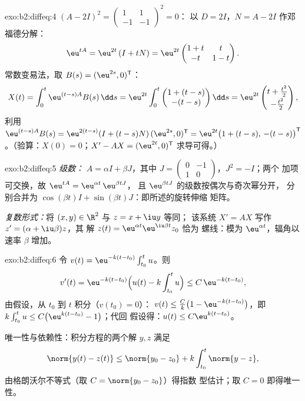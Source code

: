 \begin{solution}{exo:b2:diffeq:4}
$(A - 2I)^2 = \begin{pmatrix}1 & 1\\ -1 & -1\end{pmatrix}^2 = 0$：
以 $D = 2I$，$N = A - 2I$ 作邓福德分解：
\[
\eu^{tA} = \eu^{2t}\,(I + tN)
= \eu^{2t}\begin{pmatrix} 1 + t & t\\ -t & 1 - t\end{pmatrix}.
\]
常数变易法，取 $B(s) = (\eu^{2s}, 0)^{\mathsf T}$：
\[
X(t) = \int_0^t \eu^{(t-s)A}B(s)\,\dd s
= \eu^{2t}\int_0^t \begin{pmatrix} 1 + (t-s)\\ -(t-s)
\end{pmatrix}\dd s
= \eu^{2t}\begin{pmatrix} t + \frac{t^2}{2}\\[2pt] -\frac{t^2}{2}
\end{pmatrix},
\]
利用 $\eu^{(t-s)A}B(s) = \eu^{2(t-s)}(I + (t-s)N)\,(\eu^{2s},
0)^{\mathsf T} = \eu^{2t}\bigl(1 + (t-s),\, -(t-s)\bigr)^{\mathsf
T}$。（验算：$X(0) = 0$；$X' - AX = (\eu^{2t}, 0)^{\mathsf T}$
求导可得。）
\end{solution}

\begin{solution}{exo:b2:diffeq:5}
\emph{级数：} $A = \alpha I + \beta J$，其中 $J =
\begin{pmatrix}0 & -1\\ 1 & 0\end{pmatrix}$，$J^2 = -I$；两个
加项可交换，故 $\eu^{tA} = \eu^{\alpha t}\,\eu^{\beta tJ}$，
且 $\eu^{\beta t J}$ 的级数按偶次与奇次幂分开，
分别合并为 $\cos(\beta t)I + \sin(\beta t)J$：即所述的旋转伸缩
矩阵。

\emph{复数形式：}将 $(x, y) \in \R^2$ 与 $z = x + \iu y$ 等同；
该系统 $X' = AX$ 写作 $z' = (\alpha + \iu\beta)z$，其
解 $z(t) = \eu^{\alpha t}\eu^{\iu\beta t}z_0$ 恰为
螺线：模为 $\eu^{\alpha t}$，辐角以速率
$\beta$ 增加。
\end{solution}

\begin{solution}{exo:b2:diffeq:6}
令 $v(t) = \eu^{-k(t - t_0)}\int_{t_0}^t u$。则
\[
v'(t) = \eu^{-k(t-t_0)}\Bigl(u(t) - k\int_{t_0}^t u\Bigr)
\leq C\,\eu^{-k(t-t_0)},
\]
由假设，从 $t_0$ 到 $t$ 积分（$v(t_0) = 0$）：
$v(t) \leq \frac{C}{k}\bigl(1 - \eu^{-k(t - t_0)}\bigr)$，即
$k\int_{t_0}^t u \leq C\bigl(\eu^{k(t-t_0)} - 1\bigr)$；代回
假设得：$u(t) \leq C\eu^{k(t-t_0)}$。

唯一性与依赖性：积分方程的两个解 $y, z$
满足
\[
\norm{y(t) - z(t)} \leq \norm{y_0 - z_0} +
k\int_{t_0}^{t}\norm{y - z},
\]
由格朗沃尔不等式（取 $C = \norm{y_0 - z_0}$）得指数
型估计；取 $C = 0$ 即得唯一性。
\end{solution}

